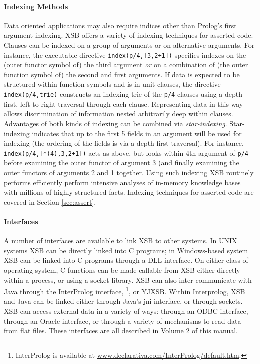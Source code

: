 
\paragraph{Indexing Methods} Data oriented applications may also
require indices other than Prolog's first argument indexing.  XSB
offers a variety of indexing techniques for asserted code.  Clauses
can be indexed on a group of arguments or on alternative arguments.
For instance, the executable directive {\tt index(p/4,[3,2+1])}
specifies indexes on the (outer functor symbol of) the third argument
{\em or} on a combination of (the outer function symbol of) the second
and first arguments.  If data is expected to be structured within
function symbols and is in unit clauses, the directive {\tt
  index(p/4,trie)} constructs an indexing trie of the {\tt p/4}
clauses using a depth-first, left-to-right traversal through each
clause.  Representing data in this way allows discrimination of
information nested arbitrarily deep within clauses.  Advantages of
both kinds of indexing can be combined via {\em star-indexing}.
Star-indexing indicates that up to the first 5 fields in an argument
will be used for indexing (the ordering of the fields is via a
depth-first traversal).  For instance, {\tt index(p/4,[*(4),3,2+1])}
acts as above, but looks within 4th argument of {\tt p/4} before
examining the outer functor of argument 3 (and finally examining the
outer functors of arguments 2 and 1 together.  Using such indexing XSB
routinely performs efficiently perform intensive analyses of in-memory
knowledge bases with millions of highly structured facts.  Indexing
techniques for asserted code are covered in Section \ref{sec:assert}.

 
\paragraph{Interfaces} A number of interfaces are available to link XSB
to other systems.  In UNIX systems XSB can be directly linked into C
programs; in Windows-based system XSB can be linked into C programs
through a DLL interface.  On either class of operating system, C
functions can be made callable from XSB either directly within a
process, or using a socket library.  XSB can also inter-communicate
with Java through the InterProlog interface, \footnote{InterProlog is
  available at \url{www.declarativa.com/InterProlog/default.htm}.}, or
YJXSB.  Within Interprolog, XSB and Java can be linked either through
Java's jni interface, or through sockets.  XSB can access external
data in a variety of ways: through an ODBC interface, through an
Oracle interface, or through a variety of mechanisms to read data from
flat files.  These interfaces are all described in Volume 2 of this
manual.

